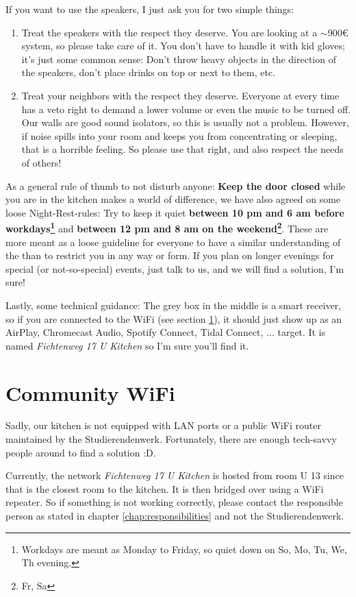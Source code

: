 If you want to use the speakers, I just ask you for two simple things:
\begin{enumerate}
    \item Treat the speakers with the respect they deserve. You are looking at a $\sim$900€ system, so please take care of it. You don't have to handle it with kid gloves; it's just some common sense: Don't throw heavy objects in the direction of the speakers, don't place drinks on top or next to them, etc.
    \item Treat your neighbors with the respect they deserve. Everyone at every time has a veto right to demand a lower volume or even the music to be turned off. Our walls are good sound isolators, so this is usually not a problem. However, if noise spills into your room and keeps you from concentrating or sleeping, that is a horrible feeling. So please use that right, and also respect the needs of others!
\end{enumerate}

As a general rule of thumb to not disturb anyone: \textbf{Keep the door closed} while you are in the kitchen makes a world of difference, we have also agreed on some loose Night-Rest-rules: Try to keep it quiet \textbf{between 10 pm and 6 am before workdays\footnote{Workdays are meant as Monday to Friday, so quiet down on So, Mo, Tu, We, Th evening.}} and \textbf{between 12 pm and 8 am on the weekend\footnote{Fr, Sa}}. These  are more meant as a loose guideline for everyone to have a similar understanding of the  than to restrict you in any way or form. If you plan on longer evenings for special (or not-so-special) events, just talk to us, and we will find a solution, I'm sure!

Lastly, some technical guidance: The grey box in the middle is a smart receiver, so if you are connected to the WiFi (see section \ref{sec:wifi}), it should just show up as an AirPlay, Chromecast Audio, Spotify Connect, Tidal Connect, ... target. It is named \textit{Fichtenweg 17 U Kitchen} so I'm sure you'll find it.

\section{Community WiFi} \label{sec:wifi}
Sadly, our kitchen is not equipped with LAN ports or a public WiFi router maintained by the Studierendenwerk. Fortunately, there are enough tech-savvy people around to find a solution :D.

Currently, the network \textit{Fichtenweg 17 U Kitchen} is hosted from room U 13 since that is the closest room to the kitchen. It is then bridged over using a WiFi repeater. So if something is not working correctly, please contact the responsible person as stated in chapter \ref{chap:responsibilities} and not the Studierendenwerk.


